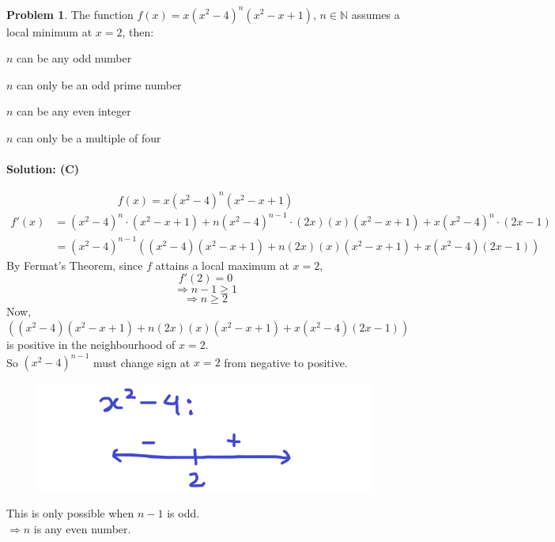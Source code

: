 \documentclass[14]{article}
\theoremstyle{definition}
\newtheorem{prob}{Problem}
\theoremstyle{case}
\begin{document}
\begin{prob}
The function $f(x) = x\left(x^2 - 4\right)^n\left(x^2 - x + 1\right)$, $n \in \mathbb{N}$ assumes a local minimum at $x = 2$, then:\\
\begin{enumerate*}[label=(\Alph*)]
\item $n$ can be any odd number\\
\item $n$ can only be an odd prime number\\
\item $n$ can be any even integer\\
\item $n$ can only be a multiple of four\\
\end{enumerate*}
\paragraph{Solution: (C)}
\[f(x) = x\left(x^2 - 4\right)^n\left(x^2 - x + 1\right)\]
\begin{align*}
f'(x) &= (x^2 - 4)^n \cdot (x^2 - x + 1) + n(x^2-4)^{n-1} \cdot(2x)(x)(x^2-x+1) + x(x^2-4)^n \cdot (2x-1)\\
&= (x^2 - 4)^{n-1}\left( (x^2-4)(x^2-x+1) + n(2x)(x)(x^2-x+1)+x(x^2-4)(2x-1) \right)
\end{align*}
By Fermat's Theorem, since $f$ attains a local maximum at $x = 2$,
\[f'(2) = 0\]
\[\Rightarrow n - 1 \geq 1\]
\[\Rightarrow n \geq 2\]
Now, \\
$\left( (x^2-4)(x^2-x+1) + n(2x)(x)(x^2-x+1)+x(x^2-4)(2x-1) \right)$ is positive in the neighbourhood of $x=2$.\\
So $(x^2-4)^{n-1}$ must change sign at $x = 2$ from negative to positive.\\
\begin{figure}[h]
\includegraphics[scale=0.5]{images/prob40}
\end{figure}
This is only possible when $n - 1$ is odd.\\
$\Rightarrow n$ is any even number.
\end{prob}
\end{document}
